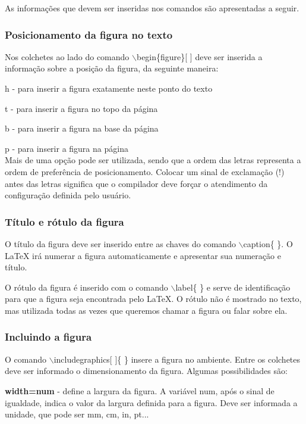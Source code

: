 As informações que devem ser inseridas nos comandos são apresentadas a seguir.

\subsubsection{Posicionamento da figura no texto}
\label{posiciona}
Nos colchetes ao lado do comando $\backslash$begin\{figure\}[ ] deve ser inserida a informação sobre a posição da figura, da seguinte maneira:

h - para inserir a figura exatamente neste ponto do texto

t - para inserir a figura no topo da página

b - para inserir a figura na base da página



\normalsize
p - para inserir a figura na página\\

Mais de uma opção pode ser utilizada, sendo que a ordem das letras representa a ordem de preferência de posicionamento. Colocar um sinal de exclamação (!) antes das letras significa que o compilador deve forçar o atendimento da configuração definida pelo usuário.

\subsubsection{Título e rótulo da figura}
O título da figura deve ser inserido entre as chaves do comando $\backslash$caption\{ \}. O LaTeX irá numerar a figura automaticamente e apresentar sua numeração e título.

O rótulo da figura é inserido com o comando $\backslash$label\{ \} e serve de identificação para que a figura seja encontrada pelo LaTeX. O rótulo não é mostrado no texto, mas utilizada todas as vezes que queremos chamar a figura ou falar sobre ela. 

\subsubsection{Incluindo a figura}
O comando $\backslash$includegraphics[ ]\{ \} insere a figura no ambiente. Entre os colchetes deve ser informado o dimensionamento da figura. Algumas possibilidades são:

\textbf{width=num} - define a largura da figura. A variável num, após o sinal de igualdade, indica o valor da largura definida para a figura. Deve ser informada a unidade, que pode ser mm, cm, in, pt...

